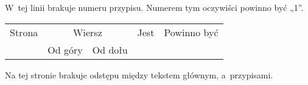 \documentclass[a4paper,11pt]{article}
\begin{document}
\noindent
{} W~tej linii brakuje numeru przypisu. Numerem tym
oczywiści powinno być „1”.

\vspace{\spaceFour}





\newpage



\begin{center}

  \begin{tabular}{|c|c|c|c|c|}
    \hline
    Strona & \multicolumn{2}{c|}{Wiersz} & Jest
                              & Powinno być \\ \cline{2-3}
    & Od góry & Od dołu & & \\
    \hline
    \hline
  \end{tabular}

\end{center}

\vspace{\spaceTwo}












\newpage


\vspace{0em}



\vspace{0em}


\noindent
{} Na tej stronie brakuje odstępu między tekstem głównym,
a~przypisami.

\vspace{\spaceFour}
\end{document}
